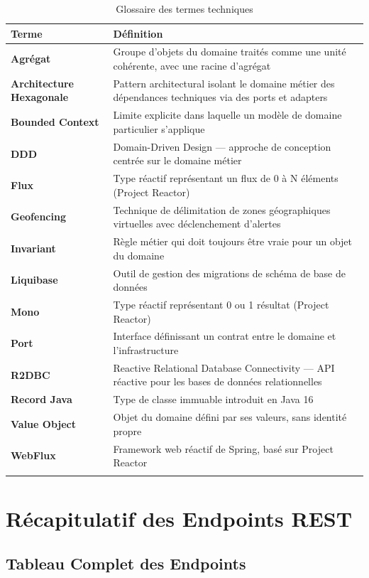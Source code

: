 \documentclass[12pt,a4paper]{report}
\begin{document}
\begin{longtable}{p{4cm}p{9cm}}
\toprule
\textbf{Terme} & \textbf{Définition} \\
\midrule
\endhead
\textbf{Agrégat} & Groupe d'objets du domaine traités comme une unité cohérente, avec une racine d'agrégat \\
\textbf{Architecture Hexagonale} & Pattern architectural isolant le domaine métier des dépendances techniques via des ports et adapters \\
\textbf{Bounded Context} & Limite explicite dans laquelle un modèle de domaine particulier s'applique \\
\textbf{DDD} & Domain-Driven Design — approche de conception centrée sur le domaine métier \\
\textbf{Flux} & Type réactif représentant un flux de 0 à N éléments (Project Reactor) \\
\textbf{Geofencing} & Technique de délimitation de zones géographiques virtuelles avec déclenchement d'alertes \\
\textbf{Invariant} & Règle métier qui doit toujours être vraie pour un objet du domaine \\
\textbf{Liquibase} & Outil de gestion des migrations de schéma de base de données \\
\textbf{Mono} & Type réactif représentant 0 ou 1 résultat (Project Reactor) \\
\textbf{Port} & Interface définissant un contrat entre le domaine et l'infrastructure \\
\textbf{R2DBC} & Reactive Relational Database Connectivity — API réactive pour les bases de données relationnelles \\
\textbf{Record Java} & Type de classe immuable introduit en Java 16 \\
\textbf{Value Object} & Objet du domaine défini par ses valeurs, sans identité propre \\
\textbf{WebFlux} & Framework web réactif de Spring, basé sur Project Reactor \\
\bottomrule
\caption{Glossaire des termes techniques}
\end{longtable}

\chapter{Récapitulatif des Endpoints REST}

\section*{Tableau Complet des Endpoints}
\end{document}
